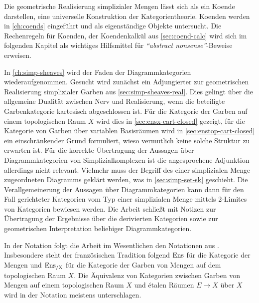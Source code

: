 Die geometrische Realisierung simplizialer Mengen lässt sich als ein
Koende darstellen, eine universelle Konstruktion der
Kategorientheorie. Koenden werden in \autoref{ch:coends} eingeführt
und als eigenständige Objekte untersucht. Die Rechenregeln für
Koenden, der Koendenkalkül aus \autoref{sec:coend-calc} wird sich im
folgenden Kapitel als wichtiges Hilfsmittel für \emph{``abstract
  nonsense''}-Beweise erweisen.

In \autoref{ch:simp-sheaves} wird der Faden der Diagrammkategorien
wiederaufgenommen. Gesucht wird zunächst ein Adjungierter zur
geometrischen Realisierung simplizialer Garben aus
\autoref{sec:simp-sheaves-real}. Dies gelingt über die allgemeine
Dualität zwischen Nerv und Realisierung, wenn die beteiligte
Garbenkategorie kartesisch abgeschlossen ist.  Für die Kategorie der
Garben auf einem topologischen Raum $X$ wird dies in
\autoref{sec:ensx-cart-closed} gezeigt, für die Kategorie von Garben
über variablen Basisräumen wird in \autoref{sec:enstop-cart-closed}
ein einschränkender Grund formuliert, wieso vermutlich keine solche
Struktur zu erwarten ist. Für die korrekte Übertragung der Aussagen
über Diagrammkategorien von Simplizialkomplexen ist die angesprochene
Adjunktion allerdings nicht relevant. Vielmehr muss der Begriff des
einer simplizialen Menge zugeordneten Diagramms geklärt werden, was in
\autoref{sec:simp-set-sk} geschieht. Die Verallgemeinerung der
Aussagen über Diagrammkategorien kann dann für den Fall gerichteter
Kategorien vom Typ einer simplizialen Menge mittels 2-Limites von
Kategorien bewiesen werden. Die Arbeit schließt mit Notizen zur
Übertragung der Ergebnisse über die derivierten Kategorien sowie zur
geometrischen Interpretation beliebiger Diagrammkategorien.

In der Notation folgt die Arbeit im Wesentlichen den Notationen aus
\cite{TG}. Insbesondere steht der französischen Tradition folgend
$\operatorname{Ens}$ für die Kategorie der Mengen und $\operatorname{Ens_{/X}}$ für die Kategorie der
Garben von Mengen auf dem topologischen Raum $X$. Die Äquivalenz von
Kategorien zwischen Garben von Mengen auf einem topologischen Raum $X$
und étalen Räumen $E \to X$ über $X$ wird in der Notation meistens
unterschlagen.

